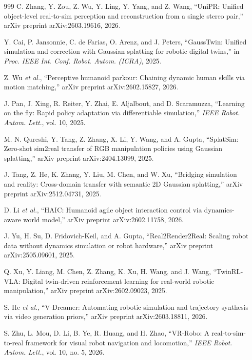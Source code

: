 \documentclass[12pt,a4paper,oneside]{report}
\begin{document}
\begin{thebibliography}{999}
C. Zhang, Y. Zou, Z. Wu, Y. Ling, Y. Yang, and Z. Wang, ``{UniPR}: Unified object-level real-to-sim perception and reconstruction from a single stereo pair,'' arXiv preprint arXiv:2603.19616, 2026.

Y. Cai, P. Jansonnie, C. de Farias, O. Arenz, and J. Peters, ``{GaussTwin}: Unified simulation and correction with Gaussian splatting for robotic digital twins,'' in \textit{Proc. IEEE Int. Conf. Robot. Autom. (ICRA)}, 2025.

Z. Wu \textit{et al.}, ``Perceptive humanoid parkour: Chaining dynamic human skills via motion matching,'' arXiv preprint arXiv:2602.15827, 2026.

J. Pan, J. Xing, R. Reiter, Y. Zhai, E. Aljalbout, and D. Scaramuzza, ``Learning on the fly: Rapid policy adaptation via differentiable simulation,'' \textit{IEEE Robot. Autom. Lett.}, vol. 10, 2025.

M. N. Qureshi, Y. Tang, Z. Zhang, X. Li, Y. Wang, and A. Gupta, ``{SplatSim}: Zero-shot sim2real transfer of {RGB} manipulation policies using Gaussian splatting,'' arXiv preprint arXiv:2404.13099, 2025.

J. Tang, Z. He, K. Zhang, Y. Liu, M. Chen, and W. Xu, ``Bridging simulation and reality: Cross-domain transfer with semantic 2D Gaussian splatting,'' arXiv preprint arXiv:2512.04731, 2025.

D. Li \textit{et al.}, ``{HAIC}: Humanoid agile object interaction control via dynamics-aware world model,'' arXiv preprint arXiv:2602.11758, 2026.

J. Yu, H. Su, D. Fridovich-Keil, and A. Gupta, ``{Real2Render2Real}: Scaling robot data without dynamics simulation or robot hardware,'' arXiv preprint arXiv:2505.09601, 2025.

Q. Xu, Y. Liang, M. Chen, Z. Zhang, K. Xu, H. Wang, and J. Wang, ``{TwinRL-VLA}: Digital twin-driven reinforcement learning for real-world robotic manipulation,'' arXiv preprint arXiv:2602.09023, 2025.

S. He \textit{et al.}, ``{V-Dreamer}: Automating robotic simulation and trajectory synthesis via video generation priors,'' arXiv preprint arXiv:2603.18811, 2026.

S. Zhu, L. Mou, D. Li, B. Ye, R. Huang, and H. Zhao, ``{VR-Robo}: A real-to-sim-to-real framework for visual robot navigation and locomotion,'' \textit{IEEE Robot. Autom. Lett.}, vol. 10, no. 5, 2026.


\end{thebibliography}
\end{document}
